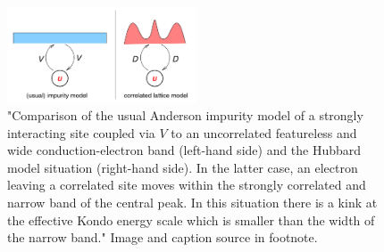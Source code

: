 \documentclass{report}
\numberwithin{equation}{section}
\begin{document}
\begin{figure}[htpb]
\centering
\includegraphics[width=0.5\textwidth]{../figures/correlated_bath.png}
\caption{"Comparison of the usual Anderson
impurity model of a strongly interacting site coupled via $V$ to
an uncorrelated featureless and wide conduction-electron band
(left-hand side) and the Hubbard model situation (right-hand
side). In the latter case, an electron leaving a correlated site
moves within the strongly correlated and narrow band of the
central peak. In this situation there is a kink at the effective
Kondo energy scale which is smaller than the width of the
narrow band." Image and caption source in footnote.}
\end{figure}
\end{document}
